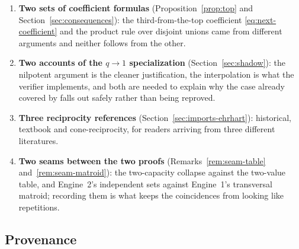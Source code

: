 \documentclass[11pt]{article}
\numberwithin{equation}{section}
\theoremstyle{definition}
\theoremstyle{remark}
\begin{document}
\begin{enumerate}[label=(\arabic*),leftmargin=2.2em]
\item \textbf{Two sets of coefficient formulas}
 (Proposition~\ref{prop:top} and Section~\ref{sec:consequences}): the
 third-from-the-top coefficient \eqref{eq:next-coefficient} and the product
 rule over disjoint unions came from different arguments and neither follows
 from the other.
\item \textbf{Two accounts of the $q\to1$ specialization}
 (Section~\ref{sec:shadow}): the nilpotent argument is the cleaner
 justification, the interpolation is what the verifier implements, and both
 are needed to explain why the case already covered by
 \cite{PriorReciprocity} falls out safely rather than being reproved.
\item \textbf{Three reciprocity references}
 (Section~\ref{sec:imports-ehrhart}): historical, textbook and
 cone-reciprocity, for readers arriving from three different literatures.
\item \textbf{Two seams between the two proofs}
 (Remarks~\ref{rem:seam-table} and~\ref{rem:seam-matroid}): the two-capacity
 collapse against the two-value table, and Engine~2's independent sets
 against Engine~1's transversal matroid; recording them is what keeps the
 coincidences from looking like repetitions.
\end{enumerate}

\subsection{Provenance}
\label{sec:provenance}
\end{document}
